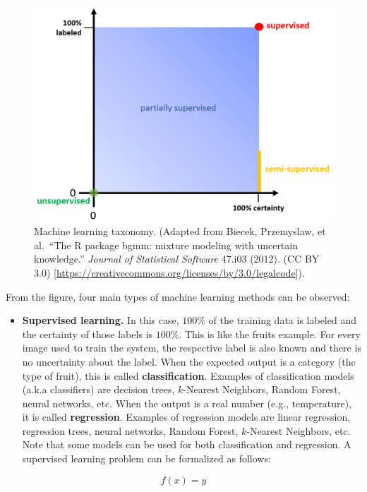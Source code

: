 \documentclass[
  11pt,
]{krantz}
\providecommand{\tightlist}{%
  \setlength{\itemsep}{0pt}\setlength{\parskip}{0pt}}
\begin{document}
\begin{figure}

{\centering \includegraphics[width=0.7\linewidth]{images/taxonomy} 

}

\caption{Machine learning taxonomy. (Adapted from Biecek, Przemyslaw, et al.~``The R package bgmm: mixture modeling with uncertain knowledge.'' \emph{Journal of Statistical Software} 47.i03 (2012). (CC BY 3.0) {[}\url{https://creativecommons.org/licenses/by/3.0/legalcode}{]}).}\label{fig:mlTaxonomy}
\end{figure}

From the figure, four main types of machine learning methods can be observed:

\begin{itemize}
\tightlist
\item
  \textbf{Supervised learning.} In this case, \(100\%\) of the training data is labeled and the certainty of those labels is \(100\%\). This is like the fruits example. For every image used to train the system, the respective label is also known and there is no uncertainty about the label. When the expected output is a category (the type of fruit), this is called \textbf{classification}. Examples of classification models (a.k.a classifiers) are decision trees, \(k\)-Nearest Neighbors, Random Forest, neural networks, etc. When the output is a real number (e.g., temperature), it is called \textbf{regression}. Examples of regression models are linear regression, regression trees, neural networks, Random Forest, \(k\)-Nearest Neighbors, etc. Note that some models can be used for both classification and regression. A supervised learning problem can be formalized as follows:
\end{itemize}

\begin{equation}
  f\left(x\right) = y
  \label{eq:supervisedLearning}
\end{equation}
\end{document}
